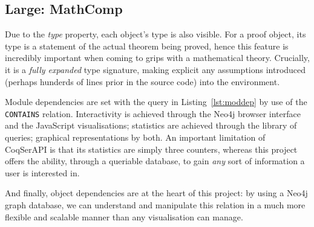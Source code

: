 \subsection{Large: MathComp}

Due to the \emph{type} property, each object's type is also visible. For a proof
object, its type is a statement of the actual theorem being proved, hence this
feature is incredibly important when coming to grips with a mathematical theory.
Crucially, it is a \emph{fully expanded} type signature, making explicit any
assumptions introduced (perhaps hunderds of lines prior in the source code) into
the environment.

Module dependencies are set with the query in Listing~\ref{lst:moddep} by use of
the \texttt{CONTAINS} relation.  Interactivity is achieved through the Neo4j
browser interface and the JavaScript visualisations; statistics are achieved
through the library of queries; graphical representations by both. An important
limitation of CoqSerAPI is that its statistics are simply three counters,
whereas this project offers the ability, through a queriable database, to gain
\emph{any} sort of information a user is interested in.

And finally, object dependencies are at the heart of this project: by using a
Neo4j graph database, we can understand and manipulate this relation in a much
more flexible and scalable manner than any visualisation can manage.
